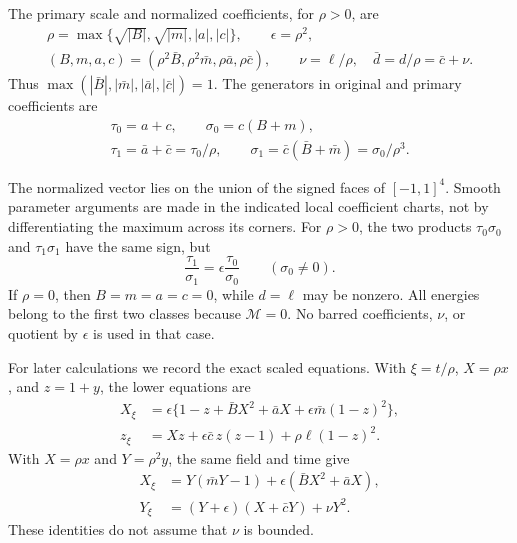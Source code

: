 \begin{definition}\label{rw:normalization}
The primary scale and normalized coefficients, for $\rho>0$, are
\begin{equation}\label{rw:geometry:primary-scale}
 \begin{gathered}
 \rho=\max\{\sqrt{|B|},\sqrt{|m|},|a|,|c|\},
 \qquad\epsilon=\rho^2,\\
 (B,m,a,c)=(\rho^2\bar B,\rho^2\bar m,
                       \rho\bar a,\rho\bar c),\qquad
 \nu=\ell/\rho,\quad\bar d=d/\rho=\bar c+\nu.
 \end{gathered}
\end{equation}
Thus $\max(|\bar B|,|\bar m|,|\bar a|,|\bar c|)=1$.
The generators in original and primary coefficients are
\begin{equation}\label{rw:geometry:generators}
 \begin{gathered}
 \tau_0=a+c,\qquad\sigma_0=c(B+m),\\
 \tau_1=\bar a+\bar c=\tau_0/\rho,\qquad
 \sigma_1=\bar c(\bar B+\bar m)=\sigma_0/\rho^3.
 \end{gathered}
\end{equation}
\end{definition}

The normalized vector lies on the union of the signed faces of
$[-1,1]^4$.  Smooth parameter arguments are made in the indicated
local coefficient charts, not by differentiating the maximum across
its corners.  For $\rho>0$, the two products $\tau_0\sigma_0$ and
$\tau_1\sigma_1$ have the same sign, but
\begin{equation}\label{rw:geometry:generator-ratio}
 \frac{\tau_1}{\sigma_1}
       =\epsilon\frac{\tau_0}{\sigma_0}\qquad(\sigma_0\ne0).
\end{equation}
If $\rho=0$, then $B=m=a=c=0$, while $d=\ell$ may be nonzero.
All energies belong to the first two classes because $\mathscr M=0$.
No barred coefficients, $\nu$, or quotient by $\epsilon$ is used in
that case.

For later calculations we record the exact scaled equations.  With
$\xi=t/\rho$, $X=\rho x$, and $z=1+y$, the lower equations are
\begin{equation}\label{rw:geometry:lower-field}
 \begin{aligned}
 X_\xi&=\epsilon\{1-z+\bar B X^2+\bar aX
                              +\epsilon\bar m(1-z)^2\},\\
 z_\xi&=Xz+\epsilon\bar c\,z(z-1)+\rho\ell(1-z)^2.
 \end{aligned}
\end{equation}
With $X=\rho x$ and $Y=\rho^2y$, the same field and time give
\begin{equation}\label{rw:geometry:upper-field}
 \begin{aligned}
 X_\xi&=Y(\bar mY-1)+\epsilon(\bar B X^2+\bar aX),\\
 Y_\xi&=(Y+\epsilon)(X+\bar cY)+\nu Y^2.
 \end{aligned}
\end{equation}
These identities do not assume that $\nu$ is bounded.

